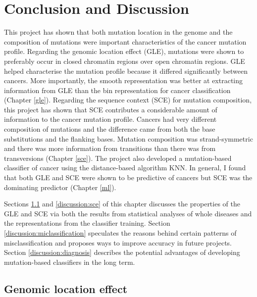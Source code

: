 \chapter{Conclusion and Discussion}\label{discussion}

This project has shown that both mutation location in the genome and the composition of mutations were important characteristics of the cancer mutation profile. Regarding the genomic location effect (GLE), mutations were shown to preferably occur in closed chromatin regions over open chromatin regions. GLE helped characterise the mutation profile because it differed significantly between cancers. More importantly, the smooth representation was better at extracting information from GLE than the bin representation for cancer classification (Chapter \ref{gle}). Regarding the sequence context (SCE) for mutation composition, this project has shown that SCE contributes a considerable amount of information to the cancer mutation profile. Cancers had very different composition of mutations and the difference came from both the base substitutions and the flanking bases. Mutation composition was strand-symmetric and there was more information from transitions than there was from transversions (Chapter \ref{sce}). The project also developed a mutation-based classifier of cancer using the distance-based algorithm KNN. In general, I found that both GLE and SCE were shown to be predictive of cancers but SCE was the dominating predictor (Chapter \ref{ml}). 

Sections \ref{discussion:gle} and \ref{discussion:sce} of this chapter discusses the properties of the GLE and SCE via both the results from statistical analyses of whole diseases and the representations from the classifier training. Section \ref{discussion:miclassification} speculates the reasons behind certain patterns of misclassification and proposes ways to improve accuracy in future projects. Section \ref{discussion:diagnosis} describes the potential advantages of developing mutation-based classifiers in the long term.

\section{Genomic location effect}\label{discussion:gle}
